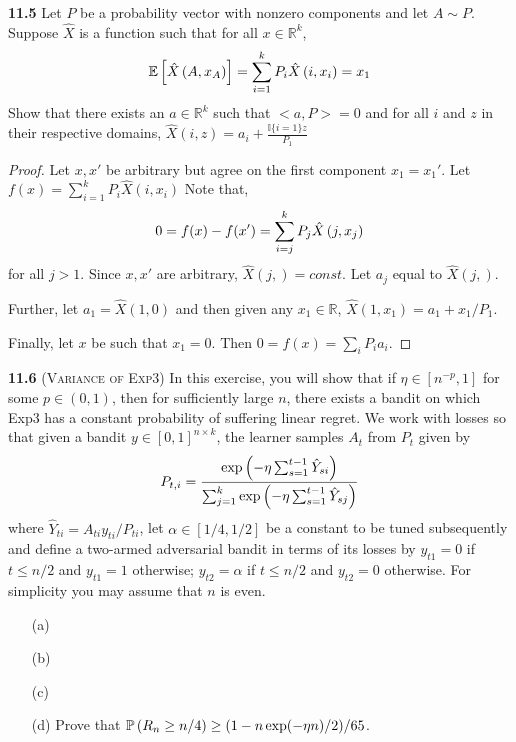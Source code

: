 \noindent\textbf{11.5} Let $P$ be a probability vector with nonzero components and let $A\sim P$. Suppose $\hat{X}$ is a function such that for all $x\in \mathbb{R}^k$,
\begin{equation}
    \mathbb{E}\left[\hat{X}\left(A, x_{A}\right)\right]=\sum_{i=1}^{k} P_{i} \hat{X}\left(i, x_{i}\right)=x_{1}\notag
\end{equation}
Show that there exists an $a\in \mathbb{R}^k$ such that $<a,P>=0$ and for all $i$ and $z$ in their respective domains, $\hat{X}(i, z)=a_{i}+\frac{\mathbb{I}\{i=1\} z}{P_{1}}$
\begin{proof}
    Let $x, x'$ be arbitrary but agree on the first component $x_1=x_1'$. Let $f(x)=\sum_{i=1}^{k} P_{i} \hat{X}\left(i, x_{i}\right)$ Note that,
    \begin{equation}
        0=f(x)-f(x')=\sum_{i=j}^{k} P_{j} \hat{X}\left(j, x_{j}\right)\notag
    \end{equation}
    for all $j>1$. Since $x, x'$ are arbitrary, $\hat{X}(j, )=const$. Let $a_j$ equal to $\hat{X}(j, )$.
    \par Further, let $a_1=\hat{X}(1, 0)$ and then given any $x_1\in \mathbb{R}$, $\hat{X}\left(1, x_{1}\right)=a_{1}+x_{1} / P_{1}$.
    \par Finally, let $x$ be such that $x_1=0$. Then $0=f(x)=\sum_{i} P_{i} a_{i}$.
\end{proof}

\noindent\textbf{11.6}
(\textsc{Variance of Exp3}) In this exercise, you will show that 
if $\eta\in[n^{-p},1]$ for some $p\in(0,1)$,
then for sufficiently large $n$,
there exists a bandit on which Exp3 has a constant probability of suffering linear regret. We work with losses so that given a bandit $y \in[0, 1]^{n\times k}$, the learner samples $A_t$ from $P_t$ given by
\begin{align*}
    P_{t,i} = \frac{ \exp\left(-\eta\sum_{s=1}^{t-1}\hat{Y}_{si} \right) }{ \sum_{j=1}^k \exp\left(-\eta\sum_{s=1}^{t-1}\hat{Y}_{sj} \right) }
\end{align*}
where $\hat{Y}_{ti}=A_{ti}y_{ti}/P_{ti}$, let $\alpha \in [1/4,1/2]$ be a constant to be tuned subsequently and define a two-armed adversarial bandit in terms of its losses by $y_{t1}=0$ if $t\le n/2$ and $y_{t1}=1$ otherwise; $y_{t2}=\alpha$ if $t\le n/2$ and $y_{t2}=0$ otherwise. For simplicity you may assume that $n$ is even. 
\begin{enumerate}
    \item[(a)] 
    \item[(b)]
    \item[(c)]
    \item[(d)] Prove that $\mathbb{P} \left(R_n\ge n/4\right) \ge (1-n\exp(-\eta n)/2)/65$.
\end{enumerate}

